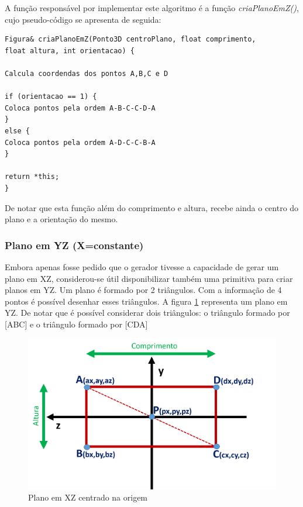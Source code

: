 A função responsável por implementar este algoritmo é a função \textit{criaPlanoEmZ()}, cujo pseudo-código se apresenta de seguida:

\begin{Verbatim}
Figura& criaPlanoEmZ(Ponto3D centroPlano, float comprimento, 
float altura, int orientacao) {

Calcula coordendas dos pontos A,B,C e D

if (orientacao == 1) {
Coloca pontos pela ordem A-B-C-C-D-A
}
else {
Coloca pontos pela ordem A-D-C-C-B-A
}

return *this;
}
\end{Verbatim}

De notar que esta função além do comprimento e altura, recebe ainda o centro do plano e a orientação do mesmo.

\subsubsection{Plano em YZ (X=constante)}

Embora apenas fosse pedido que o gerador tivesse a capacidade de gerar um plano em XZ, considerou-se útil disponibilizar também uma primitiva para criar planos em YZ.
Um plano é formado por 2 triângulos. Com a informação de 4 pontos é possível desenhar esses triângulos. A figura \ref{p1:fig:p3_planoX} representa um plano em YZ. De notar que é possível considerar dois triângulos: o triângulo formado por [ABC] e o triângulo formado por [CDA]

\begin{figure}[<+htpb+>]
	\centering
	\includegraphics[scale=0.5]{imagens/p3_planoX.png}
	\caption{Plano em XZ centrado na origem}
	\label{p1:fig:p3_planoX}
\end{figure}

